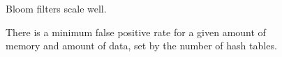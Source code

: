 \documentclass[12pt]{article} \usepackage{simplemargins}
\begin{document}
\begin{figure}
\caption{Bloom filters scale well.}
\end{figure}

\begin{figure}
\caption{There is a minimum false positive rate for a given amount of memory
and amount of data, set by the number of hash tables.}
\end{figure}
\end{document}
